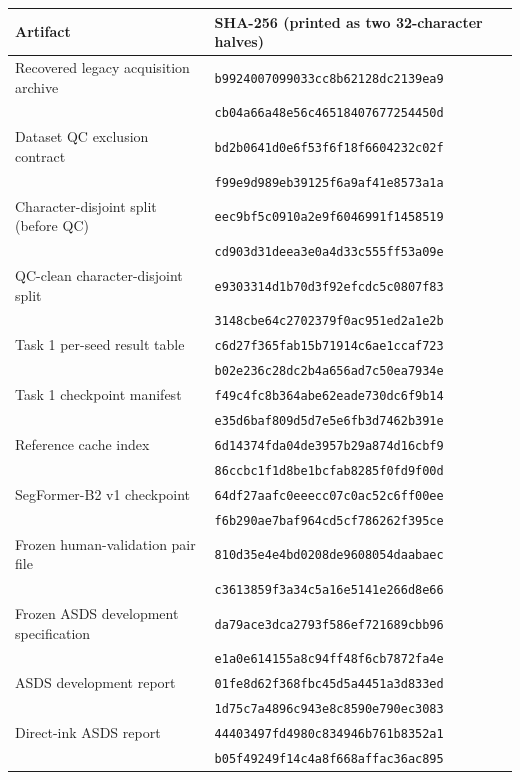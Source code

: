 \documentclass[pdflatex,sn-basic,Numbered]{sn-jnl}
\begin{document}
\begin{center}
\footnotesize
\begin{tabular}{@{}ll@{}}
\toprule
Artifact & SHA-256 (printed as two 32-character halves) \\
\midrule
Recovered legacy acquisition archive & \texttt{b9924007099033cc8b62128dc2139ea9} \\
 & \texttt{cb04a66a48e56c46518407677254450d} \\[2pt]
Dataset QC exclusion contract & \texttt{bd2b0641d0e6f53f6f18f6604232c02f} \\
 & \texttt{f99e9d989eb39125f6a9af41e8573a1a} \\[2pt]
Character-disjoint split (before QC) & \texttt{eec9bf5c0910a2e9f6046991f1458519} \\
 & \texttt{cd903d31deea3e0a4d33c555ff53a09e} \\[2pt]
QC-clean character-disjoint split & \texttt{e9303314d1b70d3f92efcdc5c0807f83} \\
 & \texttt{3148cbe64c2702379f0ac951ed2a1e2b} \\[2pt]
Task 1 per-seed result table & \texttt{c6d27f365fab15b71914c6ae1ccaf723} \\
 & \texttt{b02e236c28dc2b4a656ad7c50ea7934e} \\[2pt]
Task 1 checkpoint manifest & \texttt{f49c4fc8b364abe62eade730dc6f9b14} \\
 & \texttt{e35d6baf809d5d7e5e6fb3d7462b391e} \\[2pt]
Reference cache index & \texttt{6d14374fda04de3957b29a874d16cbf9} \\
 & \texttt{86ccbc1f1d8be1bcfab8285f0fd9f00d} \\[2pt]
SegFormer-B2 v1 checkpoint & \texttt{64df27aafc0eeecc07c0ac52c6ff00ee} \\
 & \texttt{f6b290ae7baf964cd5cf786262f395ce} \\[2pt]
Frozen human-validation pair file & \texttt{810d35e4e4bd0208de9608054daabaec} \\
 & \texttt{c3613859f3a34c5a16e5141e266d8e66} \\[2pt]
Frozen ASDS development specification & \texttt{da79ace3dca2793f586ef721689cbb96} \\
 & \texttt{e1a0e614155a8c94ff48f6cb7872fa4e} \\[2pt]
ASDS development report & \texttt{01fe8d62f368fbc45d5a4451a3d833ed} \\
 & \texttt{1d75c7a4896c943e8c8590e790ec3083} \\[2pt]
Direct-ink ASDS report & \texttt{44403497fd4980c834946b761b8352a1} \\
 & \texttt{b05f49249f14c4a8f668affac36ac895} \\[2pt]
\bottomrule
\end{tabular}
\end{center}
\end{document}
